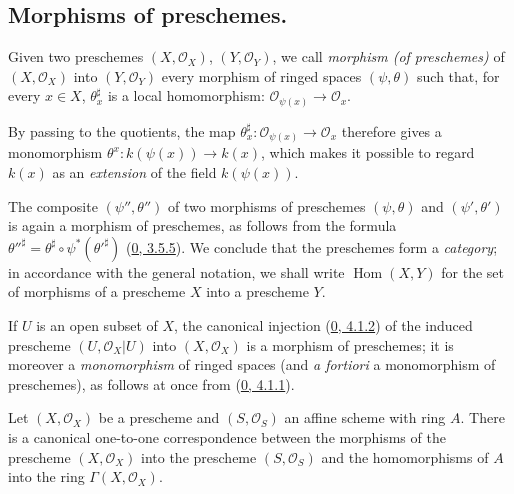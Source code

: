 \subsection{Morphisms of preschemes.}
\label{subsection:I.2.2}
\label{I.2.2}

\begin{definition}[2.2.1]
\label{I.2.2.1}
Given two preschemes $(X,\mathscr{O}_X)$, $(Y,\mathscr{O}_Y)$, we call
\emph{morphism (of preschemes)} of $(X,\mathscr{O}_X)$ into
$(Y,\mathscr{O}_Y)$ every morphism of ringed spaces $(\psi,\theta)$ such
that, for every $x\in X$, $\theta_x^\sharp$ is a local homomorphism:
$\mathscr{O}_{\psi(x)}\longrightarrow\mathscr{O}_x$.
\end{definition}


By passing to the quotients, the map
$\theta_x^\sharp:\mathscr{O}_{\psi(x)}\to\mathscr{O}_x$ therefore gives a
monomorphism $\theta^x:k(\psi(x))\to k(x)$, which makes it possible to
regard $k(x)$ as an \emph{extension} of the field $k(\psi(x))$.

\begin{env}[2.2.2]
\label{I.2.2.2}
The composite $(\psi'',\theta'')$ of two morphisms of preschemes
$(\psi,\theta)$ and $(\psi',\theta')$ is again a morphism of preschemes,
as follows from the formula
${\theta''}^\sharp=\theta^\sharp\circ\psi^*({\theta'}^\sharp)$
(\hyperref[0.3.5.5]{0, 3.5.5}). We conclude that the preschemes form
a \emph{category}; in accordance with the general notation, we shall write
$\operatorname{Hom}(X,Y)$ for the set of morphisms of a prescheme $X$ into
a prescheme $Y$.
\end{env}

\begin{example}[2.2.3]
\label{I.2.2.3}
If $U$ is an open subset of $X$, the canonical injection
(\hyperref[0.4.1.2]{0, 4.1.2}) of the induced prescheme
$(U,\mathscr{O}_X|U)$ into $(X,\mathscr{O}_X)$ is a morphism of
preschemes; it is moreover a \emph{monomorphism} of ringed spaces (and
\emph{a fortiori} a monomorphism of preschemes), as follows at once
from (\hyperref[0.4.1.1]{0, 4.1.1}).
\end{example}

\begin{proposition}[2.2.4]
\label{I.2.2.4}
Let $(X,\mathscr{O}_X)$ be a prescheme and $(S,\mathscr{O}_S)$ an affine
scheme with ring $A$. There is a canonical one-to-one correspondence between
the morphisms of the prescheme $(X,\mathscr{O}_X)$ into the prescheme
$(S,\mathscr{O}_S)$ and the homomorphisms of $A$ into the ring
$\Gamma(X,\mathscr{O}_X)$.
\end{proposition}

